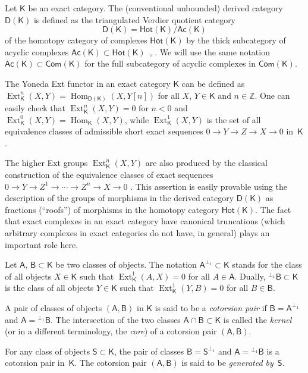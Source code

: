 \documentclass[12pt,a4paper]{amsart}
\newcommand{\+}{\nobreakdash-}
\renewcommand{\:}{\colon}
\newcommand{\rarrow}{\longrightarrow}
\DeclareMathOperator{\Hom}{Hom}
\DeclareMathOperator{\Ext}{Ext}
\newcommand{\sA}{\mathsf A}
\newcommand{\sB}{\mathsf B}
\newcommand{\sD}{\mathsf D}
\newcommand{\sK}{\mathsf K}
\newcommand{\sS}{\mathsf S}
\newcommand{\Hot}{\mathsf{Hot}}
\newcommand{\Com}{\mathsf{Com}}
\newcommand{\Ac}{\mathsf{Ac}}
\newcommand{\boZ}{\mathbb Z}
\theoremstyle{plain}
\theoremstyle{definition}
\begin{document}
 Let $\sK$ be an exact category.
 The (conventional unbounded) derived category $\sD(\sK)$ is defined
as the triangulated Verdier quotient category
$$
 \sD(\sK)=\Hot(\sK)/\Ac(\sK)
$$
of the homotopy category of complexes $\Hot(\sK)$ by the thick
subcategory of acyclic complexes $\Ac(\sK)\subset\Hot(\sK)$
\,\cite{Neem0}, \cite[Section~10]{Bueh}.
 We will use the same notation $\Ac(\sK)\subset\Com(\sK)$ for the full
subcategory of acyclic complexes in $\Com(\sK)$.

 The Yoneda Ext functor in an exact category $\sK$ can be defined
as $\Ext_\sK^n(X,Y)=\Hom_{\sD(\sK)}(X,Y[n])$ for all $X$, $Y\in\sK$
and $n\in\boZ$.
 One can easily check that $\Ext_\sK^n(X,Y)=0$ for $n<0$
and $\Ext_\sK^0(X,Y)=\Hom_\sK(X,Y)$, while $\Ext_\sK^1(X,Y)$ is
the set of all equivalence classes of admissible short exact sequences
$0\rarrow Y\rarrow Z\rarrow X\rarrow0$ in~$\sK$.

 The higher Ext groups $\Ext_\sK^n(X,Y)$ are also produced by
the classical construction of the equivalence classes of exact
sequences $0\rarrow Y\rarrow Z^1\rarrow\dotsb\rarrow Z^n\rarrow X
\rarrow0$ \cite[Proposition~A.13 of the published version or
Proposition in Section~A.7 of the \texttt{arXiv} version]{Partin}.
 This assertion is easily provable using the description of the groups
of morphisms in the derived category $\sD(\sK)$ as fractions (``roofs'')
of morphisms in the homotopy category $\Hot(\sK)$.
 The fact that exact complexes in an exact category have canonical
truncations (which arbitrary complexes in exact categories do not have,
in general) plays an important role here.

 Let $\sA$, $\sB\subset\sK$ be two classes of objects.
 The notation $\sA^{\perp_1}\subset\sK$ stands for the class of all
objects $X\in\sK$ such that $\Ext^1_\sK(A,X)=0$ for all $A\in\sA$.
 Dually, ${}^{\perp_1}\sB\subset\sK$ is the class of all objects
$Y\in\sK$ such that $\Ext^1_\sK(Y,B)=0$ for all $B\in\sB$.

 A pair of classes of objects $(\sA,\sB)$ in $\sK$ is said to be
a \emph{cotorsion pair} if $\sB=\sA^{\perp_1}$ and
$\sA={}^{\perp_1}\sB$.
 The intersection of the two classes $\sA\cap\sB\subset\sK$ is called
the \emph{kernel} (or in a different terminology, the \emph{core})
of a cotorsion pair $(\sA,\sB)$.

 For any class of objects $\sS\subset\sK$, the pair of classes
$\sB=\sS^{\perp_1}$ and $\sA={}^{\perp_1}\sB$ is a cotorsion pair
in~$\sK$.
 The cotorsion pair $(\sA,\sB)$ is said to be \emph{generated by}~$\sS$.
\end{document}
